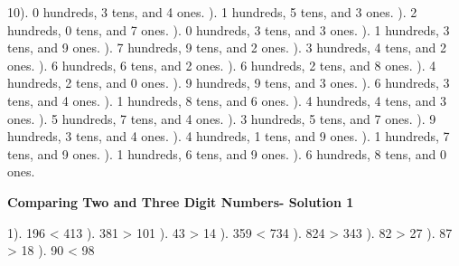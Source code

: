 \documentclass{article}%
\begin{document}
10). 0 hundreds, 3 tens, and 4 ones.%
). 1 hundreds, 5 tens, and 3 ones.%
). 2 hundreds, 0 tens, and 7 ones.%
). 0 hundreds, 3 tens, and 3 ones.%
). 1 hundreds, 3 tens, and 9 ones.%
). 7 hundreds, 9 tens, and 2 ones.%
). 3 hundreds, 4 tens, and 2 ones.%
). 6 hundreds, 6 tens, and 2 ones.%
). 6 hundreds, 2 tens, and 8 ones.%
). 4 hundreds, 2 tens, and 0 ones.%
). 9 hundreds, 9 tens, and 3 ones.%
). 6 hundreds, 3 tens, and 4 ones.%
). 1 hundreds, 8 tens, and 6 ones.%
). 4 hundreds, 4 tens, and 3 ones.%
). 5 hundreds, 7 tens, and 4 ones.%
). 3 hundreds, 5 tens, and 7 ones.%
). 9 hundreds, 3 tens, and 4 ones.%
). 4 hundreds, 1 tens, and 9 ones.%
). 1 hundreds, 7 tens, and 9 ones.%
). 1 hundreds, 6 tens, and 9 ones.%
). 6 hundreds, 8 tens, and 0 ones.%
\newline%
\newpage%
\large%
\begin{center}%
\textbf{Comparing Two and Three Digit Numbers- Solution 1}%
\newline%
\end{center} \normalsize%
1). 196 < 413%
). 381 > 101%
). 43 > 14%
). 359 < 734%
). 824 > 343%
). 82 > 27%
). 87 > 18%
). 90 < 98%
\newline%
\end{document}
